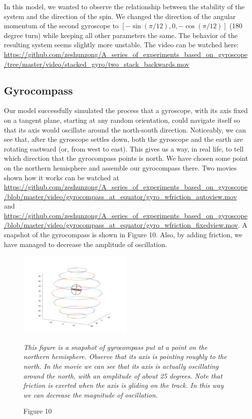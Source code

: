 \documentclass[12pt]{article}
\renewcommand{\(}{\left (}
\renewcommand{\)}{\right )}
\begin{document}
In this model, we wanted to observe the relationship between the stability of the system and the direction of the spin. We changed the direction of the angular momentum of the second gyroscope to $[-\sin(\pi/12), 0, -\cos(\pi/12)]$ (180 degree turn) while keeping all other parameters the same. The behavior of the resulting system seems slightly more unstable. The video can be watched here: \url{https://github.com/zeshunzong/A_series_of_experiments_based_on_gyroscope/tree/master/video/stacked_gyro/two_stack_backwards.mov}


\subsection{Gyrocompass}
\hspace{5mm} Our model successfully simulated the process that a gyroscope, with its axis fixed on a tangent plane, starting at any random orientation, could navigate itself so that its axis would oscillate around the north-south direction. Noticeably, we can see that, after the gyroscope settles down, both the gyroscope and the earth are rotating eastward (or, from west to east). This gives us a way, in real life, to tell which direction that the gyrocompass points is north. We have chosen some point on the northern hemisphere and assemble our gyrocompass there. Two movies shown how it works can be watched at \url{https://github.com/zeshunzong/A_series_of_experiments_based_on_gyroscope/blob/master/video/gyrocompass_at_equator/gyro_wfriction_autoview.mov} and \url{https://github.com/zeshunzong/A_series_of_experiments_based_on_gyroscope/blob/master/video/gyrocompass_at_equator/gyro_wfriction_fixedview.mov}. A snapshot of the gyrocompass is shown in Figure 10. Also, by adding friction, we have managed to decrease the amplitude of oscillation.

\begin{figure}[ht]
	\centering
	\includegraphics[width=0.5\textwidth]{demo_pointing_north.png}		\caption*{\small Figure 10}
	\footnotesize
	\emph{This figure is a snapshot of gyrocompass put at a point on the northern hemisphere. Observe that its axis is pointing roughly to the north. In the movie we can see that its axis is actually oscillating around the north, with an amplitude of about 25 degrees. Note that friction is exerted when the axis is gliding on the track. In this way we can decrease the magnitude of oscillation.}
\end{figure}
\end{document}
